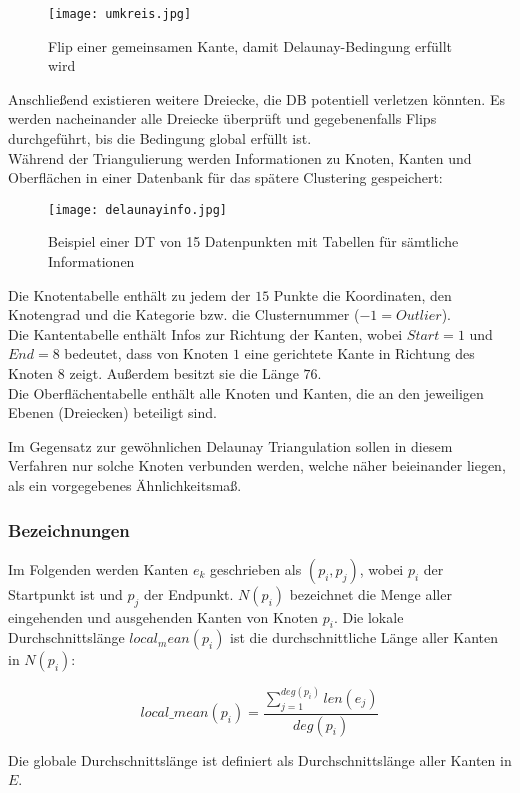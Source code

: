 \documentclass[11pt,ceqn]{book}
\begin{document}
\begin{figure}[H]
\centering
\texttt{[image: umkreis.jpg]}
\caption{Flip einer gemeinsamen Kante, damit Delaunay-Bedingung erfüllt wird}
\end{figure}

Anschließend existieren weitere Dreiecke, die DB potentiell verletzen könnten. Es werden nacheinander alle Dreiecke überprüft und gegebenenfalls Flips durchgeführt, bis die Bedingung global erfüllt ist.
\\

Während der Triangulierung werden Informationen zu Knoten, Kanten und Oberflächen in einer Datenbank für das spätere Clustering gespeichert:

\begin{figure}[H]
\centering
\texttt{[image: delaunayinfo.jpg]}
\caption{Beispiel einer DT von 15 Datenpunkten mit Tabellen für sämtliche Informationen}
\end{figure}

Die Knotentabelle enthält zu jedem der $15$ Punkte die Koordinaten, den Knotengrad und die Kategorie bzw. die Clusternummer ($-1 = Outlier$).\\
Die Kantentabelle enthält Infos zur Richtung der Kanten, wobei $Start=1$ und $End=8$ bedeutet, dass von Knoten $1$ eine gerichtete Kante in Richtung des Knoten $8$ zeigt. Außerdem besitzt sie die Länge $76$.
\\
Die Oberflächentabelle enthält alle Knoten und Kanten, die an den jeweiligen Ebenen (Dreiecken) beteiligt sind.

Im Gegensatz zur gewöhnlichen Delaunay Triangulation sollen in diesem Verfahren nur solche Knoten verbunden werden, welche näher beieinander liegen, als ein vorgegebenes Ähnlichkeitsmaß.
\\

\subsubsection{Bezeichnungen}
Im Folgenden werden Kanten $e_k$ geschrieben als $(p_i,p_j)$, wobei $p_i$ der Startpunkt ist und $p_j$ der Endpunkt. $N(p_i)$ bezeichnet die Menge aller eingehenden und ausgehenden Kanten von Knoten $p_i$. Die lokale Durchschnittslänge $local_mean(p_i)$ ist die durchschnittliche Länge aller Kanten in $N(p_i)$:

$$local\_mean(p_i) =\frac{\sum\limits_{j=1}^{deg(p_i)} len(e_j)}{deg(p_i)}$$

Die globale Durchschnittslänge ist definiert als Durchschnittslänge aller Kanten in $E$.
\end{document}
